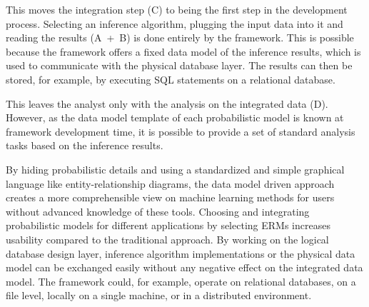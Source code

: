 \newpage

This moves the integration step (C) to being the first step in the development process. Selecting an inference algorithm, plugging the input data into it and reading the results (A~+~B) is done entirely by the framework. This is possible because the framework offers a fixed data model of the inference results, which is used to communicate with the physical database layer. The results can then be stored, for example, by executing SQL statements on a relational database.

This leaves the analyst only with the analysis on the integrated data (D). However, as the data model template of each probabilistic model is known at framework development time, it is possible to provide a set of standard analysis tasks based on the inference results.

By hiding probabilistic details and using a standardized and simple graphical language like entity-relationship diagrams, the data model driven approach creates a more comprehensible view on machine learning methods for users without advanced knowledge of these tools. Choosing and integrating probabilistic models for different applications by selecting ERMs increases usability compared to the traditional approach. By working on the logical database design layer, inference algorithm implementations or the physical data model can be exchanged easily without any negative effect on the integrated data model. The framework could, for example, operate on relational databases, on a file level, locally on a single machine, or in a distributed environment.
